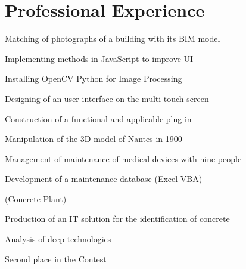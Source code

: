 \documentclass[]{deedy-resume-openfont}
\begin{document}
\begin{minipage}[t]{0.66\textwidth} 


\section{Professional Experience}

\vspace{\topsep} %
\begin{tightemize}
\item Matching of photographs of a building with its BIM model
\item Implementing methods in JavaScript to improve UI
\item Installing OpenCV Python for Image Processing
\end{tightemize}
\sectionsep

\begin{tightemize}
\item Designing of an user interface on the multi-touch screen
\item Construction of a functional and applicable plug-in
\item Manipulation of the 3D model of Nantes in 1900 
\end{tightemize}
\sectionsep

\begin{tightemize}
\item Management of maintenance of medical devices with nine people
\item Development of a maintenance database (Excel VBA)
\end{tightemize}
\sectionsep

(Concrete Plant)
\begin{tightemize}
\item Production of an IT solution for the identification of concrete
\item Analysis of deep  technologies
\item Second place in the Contest
\end{tightemize}
\sectionsep


\end{minipage}
\end{document}
